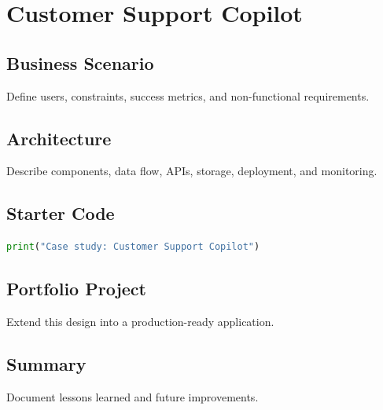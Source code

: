\chapter{Customer Support Copilot}
\label{chap:vol14-7}



\section{Business Scenario}
Define users, constraints, success metrics, and non-functional requirements.

\section{Architecture}
Describe components, data flow, APIs, storage, deployment, and monitoring.

\section{Starter Code}
\begin{lstlisting}[language=Python]
print("Case study: Customer Support Copilot")
\end{lstlisting}

\section{Portfolio Project}
Extend this design into a production-ready application.

\section{Summary}
Document lessons learned and future improvements.
